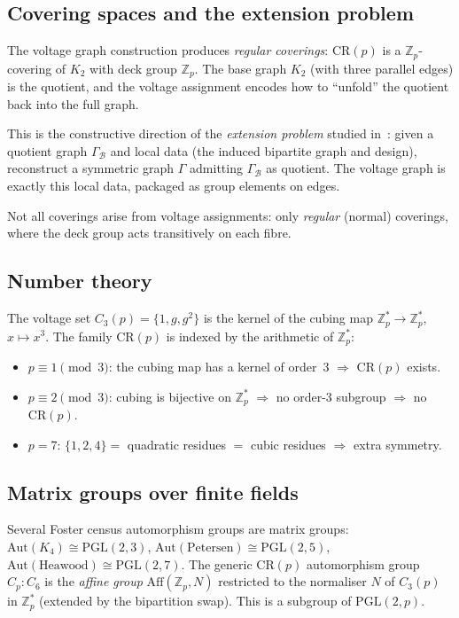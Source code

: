 \documentclass[11pt]{article}
\theoremstyle{definition}
\begin{document}
\subsection{Covering spaces and the extension problem}

The voltage graph construction produces \emph{regular coverings}:
$\mathrm{CR}(p)$ is a $\mathbb{Z}_p$-covering of $K_2$ with deck group $\mathbb{Z}_p$.
The base graph $K_2$ (with three parallel edges) is the quotient,
and the voltage assignment encodes how to ``unfold'' the quotient back into the full graph.

This is the constructive direction of the \emph{extension problem}
studied in~\cite{langer2013}: given a quotient graph $\Gamma_{\mathcal{B}}$
and local data (the induced bipartite graph and design),
reconstruct a symmetric graph $\Gamma$ admitting $\Gamma_{\mathcal{B}}$ as quotient.
The voltage graph is exactly this local data, packaged as group elements on edges.

Not all coverings arise from voltage assignments: only \emph{regular} (normal) coverings,
where the deck group acts transitively on each fibre.

\subsection{Number theory}

The voltage set $C_3(p) = \{1, g, g^2\}$ is the kernel of the cubing map
$\mathbb{Z}_p^* \to \mathbb{Z}_p^*$, $x \mapsto x^3$.
The family $\mathrm{CR}(p)$ is indexed by the arithmetic of $\mathbb{Z}_p^*$:

\begin{itemize}[nosep]
\item $p \equiv 1 \pmod{3}$: the cubing map has a kernel of order~3 $\Rightarrow$ $\mathrm{CR}(p)$ exists.
\item $p \equiv 2 \pmod{3}$: cubing is bijective on $\mathbb{Z}_p^*$ $\Rightarrow$ no order-3 subgroup $\Rightarrow$ no $\mathrm{CR}(p)$.
\item $p = 7$: $\{1,2,4\} = $ quadratic residues $=$ cubic residues $\Rightarrow$ extra symmetry.
\end{itemize}

\subsection{Matrix groups over finite fields}

Several Foster census automorphism groups are matrix groups:
$\mathrm{Aut}(K_4) \cong \mathrm{PGL}(2,3)$,
$\mathrm{Aut}(\text{Petersen}) \cong \mathrm{PGL}(2,5)$,
$\mathrm{Aut}(\text{Heawood}) \cong \mathrm{PGL}(2,7)$.
The generic $\mathrm{CR}(p)$ automorphism group $C_p {:} C_6$
is the \emph{affine group} $\mathrm{Aff}(\mathbb{Z}_p, N)$
restricted to the normaliser $N$ of $C_3(p)$ in $\mathbb{Z}_p^*$
(extended by the bipartition swap).
This is a subgroup of $\mathrm{PGL}(2, p)$.
\end{document}
